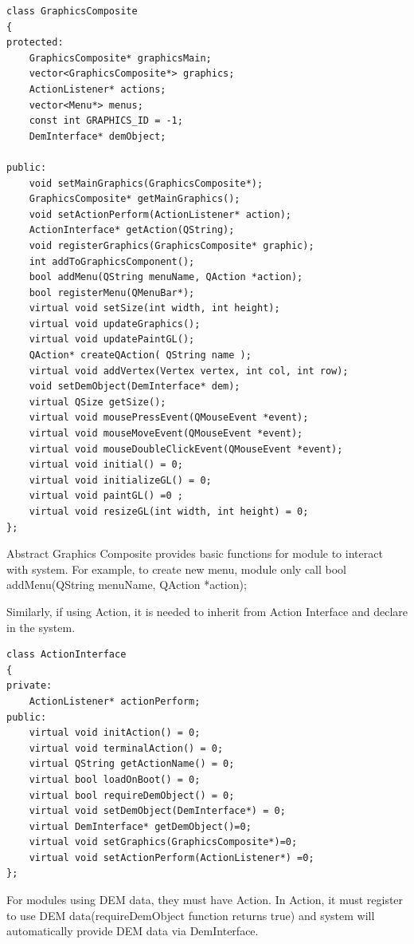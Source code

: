 \documentclass[11pt]{article}
\begin{document}
\begin{lstlisting}
class GraphicsComposite
{
protected:
    GraphicsComposite* graphicsMain;
    vector<GraphicsComposite*> graphics;
    ActionListener* actions;
    vector<Menu*> menus;
    const int GRAPHICS_ID = -1;
    DemInterface* demObject;

public:
    void setMainGraphics(GraphicsComposite*);
    GraphicsComposite* getMainGraphics();
    void setActionPerform(ActionListener* action);
    ActionInterface* getAction(QString);
    void registerGraphics(GraphicsComposite* graphic);
    int addToGraphicsComponent();
    bool addMenu(QString menuName, QAction *action);
    bool registerMenu(QMenuBar*);
    virtual void setSize(int width, int height);
    virtual void updateGraphics();
    virtual void updatePaintGL();
    QAction* createQAction( QString name );
    virtual void addVertex(Vertex vertex, int col, int row);
    void setDemObject(DemInterface* dem);
    virtual QSize getSize();
    virtual void mousePressEvent(QMouseEvent *event);
    virtual void mouseMoveEvent(QMouseEvent *event);
    virtual void mouseDoubleClickEvent(QMouseEvent *event);
    virtual void initial() = 0;
    virtual void initializeGL() = 0;
    virtual void paintGL() =0 ;
    virtual void resizeGL(int width, int height) = 0;
};
\end{lstlisting}

Abstract Graphics Composite provides basic functions for module to interact with system. For example, to create new menu, module only call 
bool addMenu(QString menuName, QAction *action);  

Similarly, if using Action, it is needed to inherit from Action Interface and declare in the system.

\begin{lstlisting}
class ActionInterface
{
private:
    ActionListener* actionPerform;
public:
    virtual void initAction() = 0;
    virtual void terminalAction() = 0;
    virtual QString getActionName() = 0;
    virtual bool loadOnBoot() = 0;
    virtual bool requireDemObject() = 0;
    virtual void setDemObject(DemInterface*) = 0;
    virtual DemInterface* getDemObject()=0;
    virtual void setGraphics(GraphicsComposite*)=0;
    virtual void setActionPerform(ActionListener*) =0;
};
\end{lstlisting}

For modules using DEM data, they must have Action. In Action, it must register to use DEM data(requireDemObject function returns true) and system will automatically provide DEM data via DemInterface.
\end{document}
